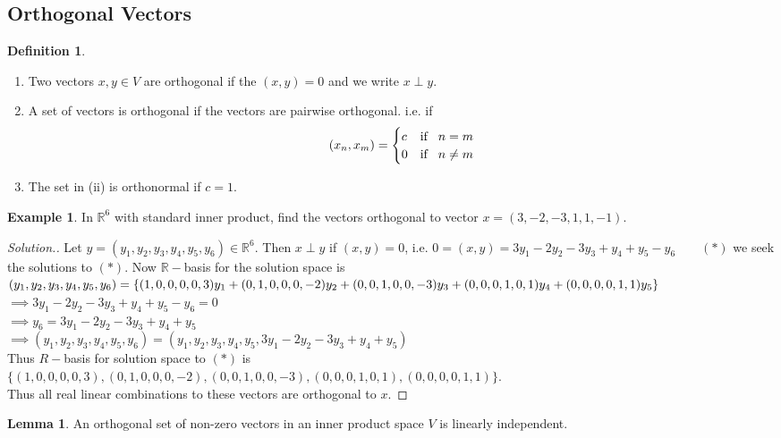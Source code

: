\documentclass[11pt,a4paper]{article}
\theoremstyle{definition}
\newtheorem{defn}[thm]{Definition}
\newtheorem{exa}[thm]{Example}
\newtheorem{lem}[thm]{Lemma}
\newenvironment{solution}
  {\renewcommand{\qedsymbol}{}\begin{proof}[\textit{Solution}.]}
  {\end{proof}}
\begin{document}
\subsection{Orthogonal Vectors}

\begin{defn}
\begin{enumerate}
\item[i.] Two vectors $x,y\in V$ are orthogonal if the $(x,y)=0$ and we write $x\perp y$.
\item[ii.] A set of vectors is orthogonal if the vectors are pairwise orthogonal. i.e. if 
$$(x_n,x_m)=
\begin{cases}
c &\text{if}\hspace{0.3cm} n=m\\
0 &\text{if}\hspace{0.3cm} n\neq m
\end{cases}$$
\item[iii.] The set in (ii) is orthonormal if $c=1$.
\end{enumerate}
\end{defn}

\begin{exa}
In $\mathbb{R}^6$ with standard inner product, find the vectors orthogonal to vector $x=(3, -2,-3,1,1,-1)$.
\end{exa}


\begin{solution}
Let $y=(y_1,y_2,y_3,y_4,y_5,y_6)\in \mathbb{R}^6$. Then $x\perp y$ if $(x,y)=0$, i.e. $0=(x,y)=3y_1-2y_2-3y_3+y_4+y_5-y_6\qquad (*)$ we seek the solutions to $(*)$. Now $\mathbb{R}-$basis for the solution space is $(y_1,y_2,y_3,y_4,y_5,y_6)=\{(1,0,0,0,0,3)y_1+(0,1,0,0,0,-2)y_2+(0,0,1,0,0,-3)y_3+(0,0,0,1,0,1)y_4\\+(0,0,0,0,1,1)y_5\}$\\ $\implies 3y_1-2y_2-3y_3+y_4+y_5-y_6=0$\\ $\implies y_6=3y_1-2y_2-3y_3+y_4+y_5$\\ $\implies (y_1,y_2,y_3,y_4,y_5,y_6)=(y_1,y_2,y_3,y_4,y_5,3y_1-2y_2-3y_3+y_4+y_5)$\\ Thus $R-$basis for solution space to $(*)$ is\\ $\{(1,0,0,0,0,3),(0,1,0,0,0,-2),(0,0,1,0,0,-3),(0,0,0,1,0,1),(0,0,0,0,1,1)\}$.\\ Thus all real linear combinations to these vectors are orthogonal to $x$.
\end{solution}


\begin{lem}\label{lem:orthogonal-independent}
An orthogonal set of non-zero vectors in an inner product space $V$ is linearly independent.
\end{lem}
\end{document}
